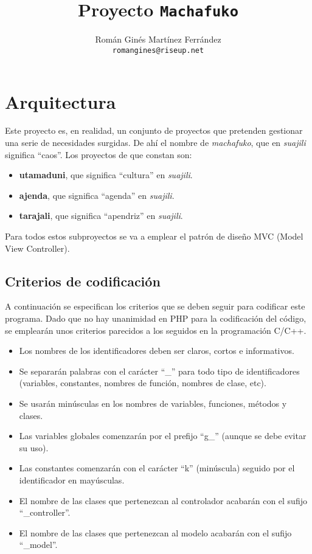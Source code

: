 \documentclass[12pt,twoside,a4paper]{article}
\title{Proyecto \texttt{Machafuko}}
\author{Román Ginés Martínez Ferrández \\ \texttt{romangines@riseup.net}}
\begin{document}
\maketitle
\thispagestyle{fancy} %
\tableofcontents

\section{Arquitectura}
Este proyecto es, en realidad, un conjunto de proyectos que pretenden gestionar una serie de necesidades surgidas. De ahí el nombre de \emph{machafuko}, que en \emph{suajili} significa ``caos''. Los proyectos de que constan son:
\begin{itemize}
\item \textbf{utamaduni}, que significa ``cultura'' en \emph{suajili}.
\item \textbf{ajenda}, que significa ``agenda'' en \emph{suajili}.
\item \textbf{tarajali}, que significa ``apendriz'' en \emph{suajili}.
\end{itemize}
Para todos estos subproyectos se va a emplear el patrón de diseño MVC (Model View Controller).

\subsection{Criterios de codificación}
A continuación se especifican los criterios que se deben seguir para codificar este programa. Dado que no hay unanimidad en PHP para la codificación del código, se emplearán unos criterios parecidos a los seguidos en la programación C/C++.
\begin{itemize}
\item Los nombres de los identificadores deben ser claros, cortos e informativos.
\item Se separarán palabras con el carácter ``\_'' para todo tipo de identificadores (variables, constantes, nombres de función, nombres de clase, etc).
\item Se usarán minúsculas en los nombres de variables, funciones, métodos y clases.
\item Las variables globales comenzarán por el prefijo ``g\_'' (aunque se debe evitar su uso).
\item Las constantes comenzarán con el carácter ``k'' (minúscula) seguido por el identificador en mayúsculas.
\item El nombre de las clases que pertenezcan al controlador acabarán con el sufijo ``\_controller''.
\item El nombre de las clases que pertenezcan al modelo acabarán con el sufijo ``\_model''.
\end{itemize}
\end{document}
